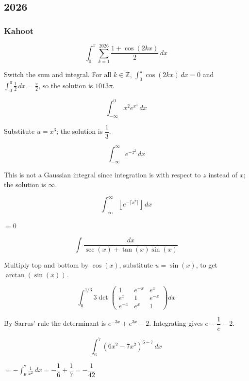\subsection*{2026}

\subsubsection*{Kahoot}
\begin{questions}

\question \[ \int_0^{\pi} \sum_{k=1}^{2026} \frac{1+\cos(2kx)}{2}\, dx \]
\begin{solution}
Switch the sum and integral. For all $k\in\mathbb Z$, $\int_0^\pi \cos(2kx)\, dx = 0$ and $\int_0^\pi \tfrac{1}{2}\, dx = \tfrac{\pi}{2}$, so the solution is $1013\pi$.
\end{solution}

\question \[ \int_{-\infty}^0 x^2e^{x^3}\, dx \]
\begin{solution}
Substitute $u=x^3$; the solution is $\dfrac{1}{3}$.
\end{solution}

\question \[ \int_{-\infty}^\infty e^{-z^2}\, dx \]
\begin{solution}
This is not a Gaussian integral since integration is with respect to $z$ instead of $x$; the solution is $\infty$.
\end{solution}

\question \[ \int_{-\infty}^\infty \left\lfloor e^{-\lceil x^2\rceil}\right\rfloor\, dx \]
\begin{solution} $= 0$ \end{solution}

\question \[ \int \frac{dx}{\sec(x)+\tan(x)\sin(x)} \]
\begin{solution}
Multiply top and bottom by $\cos(x)$, substitute $u=\sin(x)$, to get $\arctan(\sin(x))$.
\end{solution}

\question \[ \int_0^{1/3} 3\det\begin{pmatrix} 1 & e^{-x} & e^{x} \\ e^{x} & 1 & e^{-x} \\ e^{-x} & e^{x} & 1 \end{pmatrix} dx \]
\begin{solution}
By Sarrus' rule the determinant is $e^{-3x}+e^{3x}-2$. Integrating gives $e-\dfrac{1}{e}-2$.
\end{solution}

\question \[ \int_6^7 \left(6x^2-7x^2\right)^{6-7}\, dx \]
\begin{solution}
$= -\displaystyle\int_6^7 \frac{1}{x^2}\, dx = -\dfrac{1}{6}+\dfrac{1}{7} = -\dfrac{1}{42}$
\end{solution}


\end{questions}
